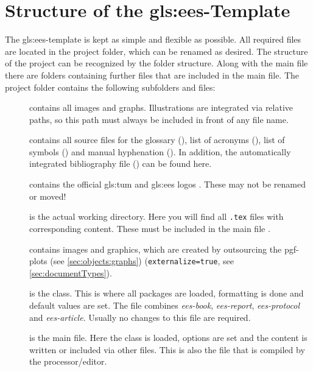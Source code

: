 \section{Structure of the \gls*{gls:ees}-\Latex Template}
\label{sec:template:structure}
The \gls{gls:ees}-\Latex template is kept as simple and flexible as possible. All required files are located in the \Latex project folder, which can be renamed as desired. The structure of the project can be recognized by the folder structure. Along with the main file \mainfile there are folders containing further files that are included in the main file. The project folder contains the following subfolders and files:

\begin{description}
	\item[\xspace\imgdir] contains all images and graphs. Illustrations are integrated via relative paths, so this path must always be included in front of any file name.
	\item[\xspace\listdir] contains all source files for the glossary (\glofile), list of acronyms \mbox{(\acrfile)}, list of symbols (\symfile) and manual hyphenation \linebreak(\hypfile). In addition, the automatically integrated bibliography file \linebreak(\litfile) can be found here.
	\item[\xspace\logodir] contains the official \gls{gls:tum} and \gls{gls:ees} logos . These may not be renamed or moved!
	\item[\xspace\texdir] is the actual working directory. Here you will find all \texttt{.tex} files with corresponding content. These must be included in the main file \mainfile.
	\item[\xspace\tikzdir] contains images and graphics, which are created by outsourcing the pgf-plots (see \autoref{sec:objects:graphs}) (\texttt{externalize=true}, see \autoref{sec:documentTypes}).
	\item[\xspace\classfile] is the \Latex class. This is where all packages are loaded, formatting is done and default values are set. The file combines \textit{ees-book}, \textit{ees-report}, \textit{ees-protocol} and \textit{ees-article}. Usually no changes to this file are required.
	\item[\xspace\mainfile] is the \Latex main file. Here the class is loaded, options are set and the content is written or included via other files. This is also the file that is compiled by the processor/editor.
\end{description}

